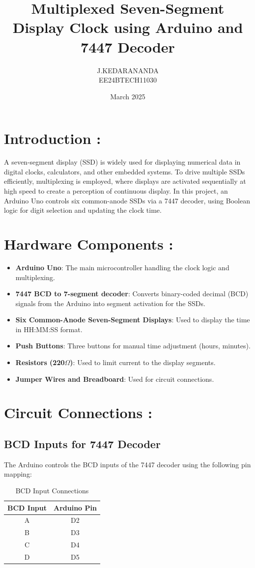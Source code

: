 \documentclass[12pt]{article}
\title{\textbf{Multiplexed Seven-Segment Display Clock using Arduino and 7447 Decoder}}
\author{J.KEDARANANDA\\EE24BTECH11030}
\date{March 2025}
\begin{document}
	
	\maketitle
	\tableofcontents
	\newpage
	
	
	\section{Introduction : }
	A seven-segment display (SSD) is widely used for displaying numerical data in digital clocks, calculators, and other embedded systems. To drive multiple SSDs efficiently, multiplexing is employed, where displays are activated sequentially at high speed to create a perception of continuous display. In this project, an Arduino Uno controls six common-anode SSDs via a 7447 decoder, using Boolean logic for digit selection and updating the clock time.
	
	\section{Hardware Components : }
	\begin{itemize}
		\item \textbf{Arduino Uno}: The main microcontroller handling the clock logic and multiplexing.
		\item \textbf{7447 BCD to 7-segment decoder}: Converts binary-coded decimal (BCD) signals from the Arduino into segment activation for the SSDs.
		\item \textbf{Six Common-Anode Seven-Segment Displays}: Used to display the time in HH:MM:SS format.
		\item \textbf{Push Buttons}: Three buttons for manual time adjustment (hours, minutes).
		\item \textbf{Resistors (220$\Omega$)}: Used to limit current to the display segments.
		\item \textbf{Jumper Wires and Breadboard}: Used for circuit connections.
	\end{itemize}
	
	\section{Circuit Connections : }
	\subsection{BCD Inputs for 7447 Decoder}
	The Arduino controls the BCD inputs of the 7447 decoder using the following pin mapping:
	\begin{table}[h]
		\centering
		\begin{tabular}{|c|c|}
			\hline
			\textbf{BCD Input} & \textbf{Arduino Pin} \\
			\hline
			A & D2 \\
			B & D3 \\
			C & D4 \\
			D & D5 \\
			\hline
		\end{tabular}
		\caption{BCD Input Connections}
	\end{table}
	\newpage
\end{document}
